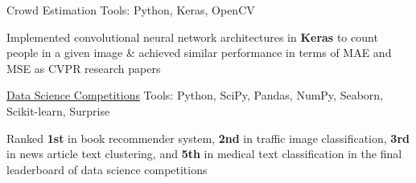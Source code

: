 \begin{cventries}
  \cventryprojects
    {Crowd Estimation} %
    {Tools: Python, Keras, OpenCV} %
    {
      \begin{cvitems} %
        \item {Implemented convolutional neural network architectures in \textbf{Keras} to count people in a given image \& achieved similar performance in terms of MAE and MSE as CVPR research papers}
      \end{cvitems}
    }

  \cventryprojects
    {\href{https://github.com/k-chuang/data-science-competitions}{Data Science Competitions}} %
    {Tools: Python, SciPy, Pandas, NumPy, Seaborn, Scikit-learn, Surprise} %
    {
      \begin{cvitems} %
        \item {Ranked \textbf{1st} in book recommender system, \textbf{2nd} in traffic image classification, \textbf{3rd} in news article text clustering, and \textbf{5th} in medical text classification in the final leaderboard of data science competitions}
      \end{cvitems}
    }


\end{cventries}
